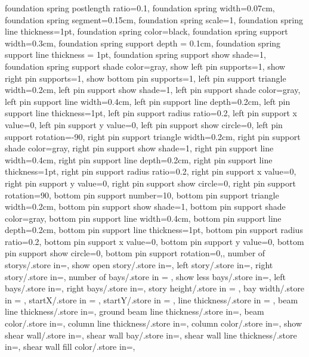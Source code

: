 {{  foundation spring postlength ratio=0.1,
  foundation spring width=0.07cm,
  foundation spring segment=0.15cm,
  foundation spring scale=1,
  foundation spring line thickness=1pt,
  foundation spring color=black,
  foundation spring support width=0.3cm,
  foundation spring support depth = 0.1cm,
  foundation spring support line thickness = 1pt,
  foundation spring support show shade=1,
  foundation spring support shade color=gray,
  show left pin supports=1,
  show right pin supports=1,
  show bottom pin supports=1,
  left pin support triangle width=0.2cm,
  left pin support show shade=1,
  left pin support shade color=gray,
  left pin support line width=0.4cm,
  left pin support line depth=0.2cm,
  left pin support line thickness=1pt,
  left pin support radius ratio=0.2,
  left pin support x value=0,
  left pin support y value=0,
  left pin support show circle=0,
  left pin support rotation=-90,
  right pin support triangle width=0.2cm,
  right pin support shade color=gray,
  right pin support show shade=1,
  right pin support line width=0.4cm,
  right pin support line depth=0.2cm,
  right pin support line thickness=1pt,
  right pin support radius ratio=0.2,
  right pin support x value=0,
  right pin support y value=0,
  right pin support show circle=0,
  right pin support rotation=90,
  bottom pin support number=10,
  bottom pin support triangle width=0.2cm,
  bottom pin support show shade=1,
  bottom pin support shade color=gray,
  bottom pin support line width=0.4cm,
  bottom pin support line depth=0.2cm,
  bottom pin support line thickness=1pt,
  bottom pin support radius ratio=0.2,
  bottom pin support x value=0,
  bottom pin support y value=0,
  bottom pin support show circle=0,
  bottom pin support rotation=0,},
  number of storys/.store in=\storynumber,
  show open story/.store in=\showopenstory,
  left story/.store in=\leftstory,
  right story/.store in=\rightstory,
  number of bays/.store in = \baynumber,
  show less bays/.store in=\showlessbays,
  left bays/.store in=\leftbays,
  right bays/.store in=\rightbays,
  story height/.store in = \storyheight,
  bay width/.store in = \baywidth,
  startX/.store in = \startx,
  startY/.store in = \starty,
  line thickness/.store in = \linet,
  beam line thickness/.store in=\beamlinet,
  ground beam line thickness/.store in=\groundbeamlinet,
  beam color/.store in=\beamcolor,
  column line thickness/.store in=\collinet,
  column color/.store in=\columncolor,
  show shear wall/.store in=\showshearwall,
  shear wall bay/.store in=\shearwallbay,
  shear wall line thickness/.store in=\shearwalllinet,
  shear wall fill color/.store in=\shearwallfillcolor,
}
